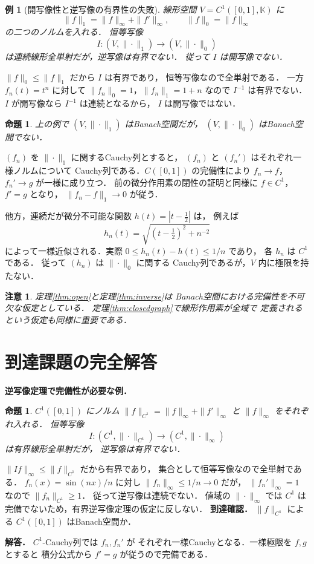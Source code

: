\documentclass[a5paper,10pt,onecolumn]{jsarticle}
\makeatletter
\theoremstyle{mathnotetheorem}
\newtheorem{proposition}[theorem]{命題}
\newtheorem{example}[theorem]{例}
\newtheorem{remark}[theorem]{注意}
\renewcommand{\proofname}{証明}
\renewenvironment{proof}[1][\proofname]{%
  \par\pushQED{\qed}\normalfont\topsep4\p@\@plus2\p@\relax
  \trivlist\item[\hskip\labelsep\bfseries #1]\ignorespaces
}{\popQED\endtrivlist\@endpefalse}
\makeatother
\begin{document}
\begin{example}[開写像性と逆写像の有界性の失敗]
線形空間 $V=C^1([0,1],\mathbb K)$ に
\[
 \|f\|_1=\|f\|_\infty+\|f'\|_\infty,\qquad
 \|f\|_0=\|f\|_\infty
\]
の二つのノルムを入れる．
恒等写像
\[
 I:(V,\|\cdot\|_1)\longrightarrow(V,\|\cdot\|_0)
\]
は連続線形全単射だが，逆写像は有界でない．
従って $I$ は開写像でない．
\end{example}
\begin{proof}
$\|f\|_0\le\|f\|_1$ だから $I$ は有界であり，
恒等写像なので全単射である．
一方 $f_n(t)=t^n$ に対して
$\|f_n\|_0=1$，$\|f_n\|_1=1+n$ なので
$I^{-1}$ は有界でない．
$I$ が開写像なら $I^{-1}$ は連続となるから，
$I$ は開写像ではない．
\end{proof}

\begin{proposition}
上の例で $(V,\|\cdot\|_1)$ はBanach空間だが，
$(V,\|\cdot\|_0)$ はBanach空間でない．
\end{proposition}
\begin{proof}
$(f_n)$ を $\|\cdot\|_1$ に関するCauchy列とすると，
$(f_n)$ と $(f_n')$ はそれぞれ一様ノルムについて
Cauchy列である．$C([0,1])$ の完備性により
$f_n\to f$，$f_n'\to g$ が一様に成り立つ．
前の微分作用素の閉性の証明と同様に
$f\in C^1$，$f'=g$ となり，
$\|f_n-f\|_1\to0$ が従う．

他方，連続だが微分不可能な関数
$h(t)=|t-\tfrac12|$ は，
例えば
\[
 h_n(t)=\sqrt{(t-\tfrac12)^2+n^{-2}}
\]
によって一様近似される．実際
$0\le h_n(t)-h(t)\le1/n$ であり，
各 $h_n$ は $C^1$ である．
従って $(h_n)$ は $\|\cdot\|_0$ に関する
Cauchy列であるが，$V$ 内に極限を持たない．
\end{proof}

\begin{remark}
定理\ref{thm:open}と定理\ref{thm:inverse}は
Banach空間における完備性を不可欠な仮定としている．
定理\ref{thm:closedgraph}で線形作用素が全域で
定義されるという仮定も同様に重要である．
\end{remark}


\section{到達課題の完全解答}
\noindent\textbf{逆写像定理で完備性が必要な例．}
\begin{proposition}
$C^1([0,1])$ にノルム
$\|f\|_{C^1}=\|f\|_\infty+\|f'\|_\infty$ と
$\|f\|_\infty$ をそれぞれ入れる．
恒等写像
\[
I:(C^1,\|\cdot\|_{C^1})
\longrightarrow(C^1,\|\cdot\|_\infty)
\]
は有界線形全単射だが，
逆写像は有界でない．
\end{proposition}
\begin{proof}
$\|If\|_\infty\le\|f\|_{C^1}$ だから有界であり，
集合として恒等写像なので全単射である．
$f_n(x)=\sin(nx)/n$ に対し
$\|f_n\|_\infty\le1/n\to0$ だが，
$\|f_n'\|_\infty=1$ なので
$\|f_n\|_{C^1}\ge1$．
従って逆写像は連続でない．
値域の $\|\cdot\|_\infty$ では $C^1$ は
完備でないため，有界逆写像定理の仮定に反しない．
\end{proof}
\noindent\textbf{到達確認．}
$\|f\|_{C^1}$ による $C^1([0,1])$ はBanach空間か．
\par\noindent\textbf{解答．}
$C^1$-Cauchy列では $f_n,f_n'$ が
それぞれ一様Cauchyとなる．一様極限を $f,g$ とすると
積分公式から $f'=g$ が従うので完備である．
\end{document}
